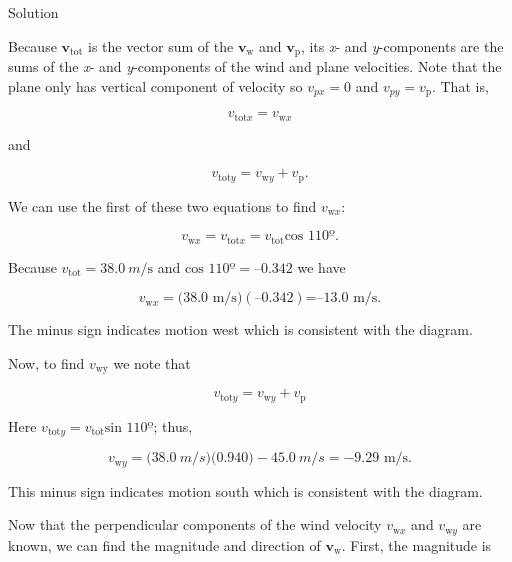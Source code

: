 \documentclass[
]{book}
\newenvironment{tinysection}{}{}
\begin{document}
\begin{tinysection}

{Solution}

\end{tinysection}

Because \(\textbf{v}_{\text{tot}}{}\) is the vector sum of the
\(\textbf{v}_{\text{w}}{}\) and \(\textbf{v}_{\text{p}}{}\), its \emph{x}- and
\emph{y}-components are the sums of the \emph{x}- and \emph{y}-components of the wind
and plane velocities. Note that the plane only has vertical component of
velocity so \({v_{px} = 0}{}\) and \({v_{py} = v_{\text{p}}}{}\). That is,

\leavevmode\hypertarget{eip-190}{}%
\[{v_{\text{tot}x} = v_{\text{w}x}}{}\]

and

\leavevmode\hypertarget{eip-690}{}%
\[{{v_{\text{tot}y} = {v_{\text{w}y} + v_{\text{p}}}}\text{.}}{}\]

We can use the first of these two equations to find \(v_{\text{w}x}{}\):

\leavevmode\hypertarget{eip-615}{}%
\[{{{{v_{\text{w}x} = v_{\text{tot}x}} = v_{\text{tot}}}\text{cos\ 110º}}\text{.}}{}\]

Because \({v_{\text{tot}} = \text{38}}\text{.}{0\ m/\text{s}}\) and
\({\text{cos\ 110º} = –0.342}{}\) we have

\leavevmode\hypertarget{eip-112}{}%
\[{{v_{\text{w}x} = (}\text{38}\text{.}\text{0\ m/s})(\text{–0}\text{.}\text{342})\text{=–13}\text{.}\text{0\ m/s.}}{}\]

The minus sign indicates motion west which is consistent with the
diagram.

Now, to find \(v_{\text{w}\text{y}}{}\) we note that

\leavevmode\hypertarget{eip-142}{}%
\[{v_{\text{tot}y} = {v_{\text{w}y} + v_{\text{p}}}}{}\]

Here \({{{v_{\text{tot}y} =}v_{\text{tot}}}\text{sin~110º}}{}\); thus,

\leavevmode\hypertarget{eip-206}{}%
\[{{v_{\text{w}y} = (}\text{38}\text{.}0\ m/s)(0\text{.}\text{940}{) - \text{45}}\text{.}0\ m/s{= {- 9}}\text{.}\text{29\ m/s.}}{}\]

This minus sign indicates motion south which is consistent with the
diagram.

Now that the perpendicular components of the wind velocity
\(v_{\text{w}x}{}\) and \(v_{\text{w}y}{}\) are known, we can find the
magnitude and direction of \(\textbf{v}_{\text{w}}{}\). First, the
magnitude is
\end{document}
